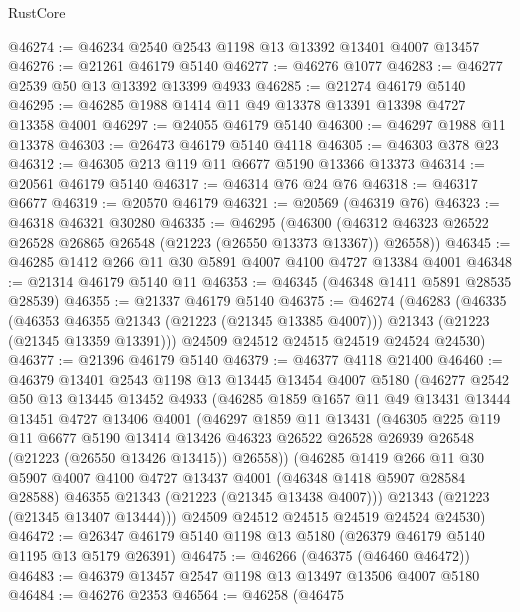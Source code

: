 \begin{lexlean}{RustCore}
\begin{coremodule}
@46274 := @46234 @2540 @2543 @1198 @13 @13392 @13401 @4007 @13457
@46276 := @21261 @46179 @5140
@46277 := @46276 @1077
@46283 := @46277 @2539 @50 @13 @13392 @13399 @4933
@46285 := @21274 @46179 @5140
@46295 := @46285 @1988 @1414 @11 @49 @13378 @13391 @13398 @4727 @13358 @4001
@46297 := @24055 @46179 @5140
@46300 := @46297 @1988 @11 @13378
@46303 := @26473 @46179 @5140 @4118
@46305 := @46303 @378 @23
@46312 := @46305 @213 @119 @11 @6677 @5190 @13366 @13373
@46314 := @20561 @46179 @5140
@46317 := @46314 @76 @24 @76
@46318 := @46317 @6677
@46319 := @20570 @46179
@46321 := @20569 (@46319 @76)
@46323 := @46318 @46321 @30280
@46335 := @46295
    (@46300 (@46312 @46323 @26522 @26528 @26865 @26548 (@21223 (@26550 @13373 @13367)) @26558))
@46345 := @46285 @1412 @266 @11 @30 @5891 @4007 @4100 @4727 @13384 @4001
@46348 := @21314 @46179 @5140 @11
@46353 := @46345 (@46348 @1411 @5891 @28535 @28539)
@46355 := @21337 @46179 @5140
@46375 := @46274
    (@46283
      (@46335
        (@46353 @46355 @21343 (@21223 (@21345 @13385 @4007)))
        @21343
        (@21223 (@21345 @13359 @13391)))
      @24509
      @24512
      @24515
      @24519
      @24524
      @24530)
@46377 := @21396 @46179 @5140
@46379 := @46377 @4118 @21400
@46460 := @46379
    @13401
    @2543
    @1198
    @13
    @13445
    @13454
    @4007
    @5180
    (@46277
      @2542
      @50
      @13
      @13445
      @13452
      @4933
      (@46285
        @1859
        @1657
        @11
        @49
        @13431
        @13444
        @13451
        @4727
        @13406
        @4001
        (@46297
          @1859
          @11
          @13431
          (@46305
            @225
            @119
            @11
            @6677
            @5190
            @13414
            @13426
            @46323
            @26522
            @26528
            @26939
            @26548
            (@21223 (@26550 @13426 @13415))
            @26558))
        (@46285
          @1419
          @266
          @11
          @30
          @5907
          @4007
          @4100
          @4727
          @13437
          @4001
          (@46348 @1418 @5907 @28584 @28588)
          @46355
          @21343
          (@21223 (@21345 @13438 @4007)))
        @21343
        (@21223 (@21345 @13407 @13444)))
      @24509
      @24512
      @24515
      @24519
      @24524
      @24530)
@46472 := @26347 @46179 @5140 @1198 @13 @5180 (@26379 @46179 @5140 @1195 @13 @5179 @26391)
@46475 := @46266 (@46375 (@46460 @46472))
@46483 := @46379 @13457 @2547 @1198 @13 @13497 @13506 @4007 @5180
@46484 := @46276 @2353
@46564 := @46258
    (@46475

\end{coremodule}
\end{lexlean}
